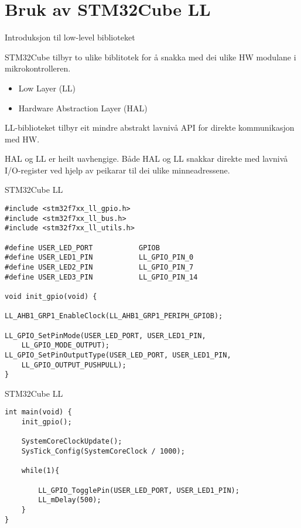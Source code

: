 \section{Bruk av STM32Cube LL}

\begin{frame}{Introduksjon til low-level biblioteket}
	
	STM32Cube tilbyr to ulike biblitotek for å snakka med dei ulike HW modulane i mikrokontrolleren.
	
	\begin{itemize}
		\item Low Layer (LL)
		\item Hardware Abstraction Layer (HAL)
	\end{itemize}
	
	LL-biblioteket tilbyr eit mindre abstrakt lavnivå API for direkte kommunikasjon med HW.
	
	HAL og LL er heilt uavhengige. Både HAL og LL snakkar direkte med lavnivå I/O-register ved hjelp av peikarar til dei ulike minneadressene.
	
\end{frame}




\begin{frame}[containsverbatim]{STM32Cube LL}
	
\begin{verbatim}
#include <stm32f7xx_ll_gpio.h>
#include <stm32f7xx_ll_bus.h>
#include <stm32f7xx_ll_utils.h>

#define USER_LED_PORT           GPIOB
#define USER_LED1_PIN           LL_GPIO_PIN_0
#define USER_LED2_PIN           LL_GPIO_PIN_7
#define USER_LED3_PIN           LL_GPIO_PIN_14

void init_gpio(void) {
	
LL_AHB1_GRP1_EnableClock(LL_AHB1_GRP1_PERIPH_GPIOB);
	
LL_GPIO_SetPinMode(USER_LED_PORT, USER_LED1_PIN,
	LL_GPIO_MODE_OUTPUT);
LL_GPIO_SetPinOutputType(USER_LED_PORT, USER_LED1_PIN,
	LL_GPIO_OUTPUT_PUSHPULL);
}
	\end{verbatim}
	
\end{frame}

\begin{frame}[containsverbatim]{STM32Cube LL}
	
\begin{verbatim}
int main(void) {
	init_gpio();
	
	SystemCoreClockUpdate();
	SysTick_Config(SystemCoreClock / 1000);
	
	while(1){
		
		LL_GPIO_TogglePin(USER_LED_PORT, USER_LED1_PIN);
		LL_mDelay(500);
	}
}
\end{verbatim}
	
\end{frame}
